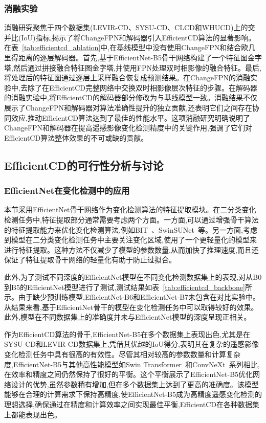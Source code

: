 \subsubsection{消融实验}

消融研究聚焦于四个数据集(LEVIR-CD、SYSU-CD、CLCD和WHUCD)上的交并比(IoU)指标,揭示了将ChangeFPN和解码器引入EfficientCD算法的显著影响。在表~\ref{tab:efficientcd_ablation}中,在基线模型中没有使用ChangeFPN和结合欧几里得距离的逐层解码器。首先,基于EfficientNet-B5骨干网络构建了一个特征图金字塔,然后通过拼接融合特征图金字塔,并使用FPN处理双时相影像的融合特征。最后,将处理后的特征图通过逐层上采样融合恢复成预测结果。在ChangeFPN的消融实验中,去除了在EfficientCD完整网络中交换双时相影像层次特征的步骤。在解码器的消融实验中,将EfficientCD的解码器部分修改为与基线模型一致。消融结果不仅展示了ChangeFPN和解码器对算法准确性提升的独立贡献,还表明它们之间存在协同效应,推动EfficientCD算法达到了最佳的性能水平。这项消融研究明确说明了ChangeFPN和解码器在提高遥感影像变化检测精度中的关键作用,强调了它们对EfficientCD算法整体效果的不可或缺的贡献。

\subsection{EfficientCD的可行性分析与讨论}

\subsubsection{EfficientNet在变化检测中的应用}

本节采用EfficientNet骨干网络作为变化检测算法的特征提取模块。在二分类变化检测任务中,特征提取部分通常需要考虑两个方面。一方面,可以通过增强骨干算法的特征提取能力来优化变化检测算法,例如BIT~\cite{chen_remote_2022}、SwinSUNet~\cite{Zhang2022SwinSUNetPT}等。另一方面,考虑到模型在二分类变化检测任务中主要关注变化区域,使用了一个更轻量化的模型来进行特征提取。这种方法不仅减少了模型的参数数量,从而加快了推理速度,而且还保证了特征提取骨干网络的轻量化有助于防止过拟合。

此外,为了测试不同深度的EfficientNet模型在不同变化检测数据集上的表现,对从B0到B5的EfficientNet模型进行了测试,测试结果如表~\ref{tab:efficientcd_backbone}所示。由于缺少预训练模型,EfficientNet-B6和EfficientNet-B7未包含在对比实验中。从结果来看,基于EfficientNet骨干的模型在变化检测任务中可以取得较好的效果。此外,模型在不同数据集上的准确度并未与EfficientNet模型的深度呈现正相关。

作为EfficientCD算法的骨干,EfficientNet-B5在多个数据集上表现出色,尤其是在SYSU-CD和LEVIR-CD数据集上,凭借其优越的IoU得分,表明其在复杂的遥感影像变化检测任务中具有很高的有效性。尽管其相对较高的参数数量和计算复杂度,EfficientNet-B5与其他高性能模型如Swin Transformer~\cite{Liu2021SwinTH}和ConvNeXt~\cite{Liu2022ACF}系列相比,在效率和精度之间仍然保持了很好的平衡。这个平衡展示了EfficientNet-B5优化网络设计的优势,虽然参数稍有增加,但在多个数据集上达到了更高的准确度。该模型能够在合理的计算需求下保持高精度,使EfficientNet-B5成为高精度遥感变化检测的理想选择,确保通过在精度和计算效率之间实现最佳平衡,EfficientCD在各种数据集上都能表现出色。

